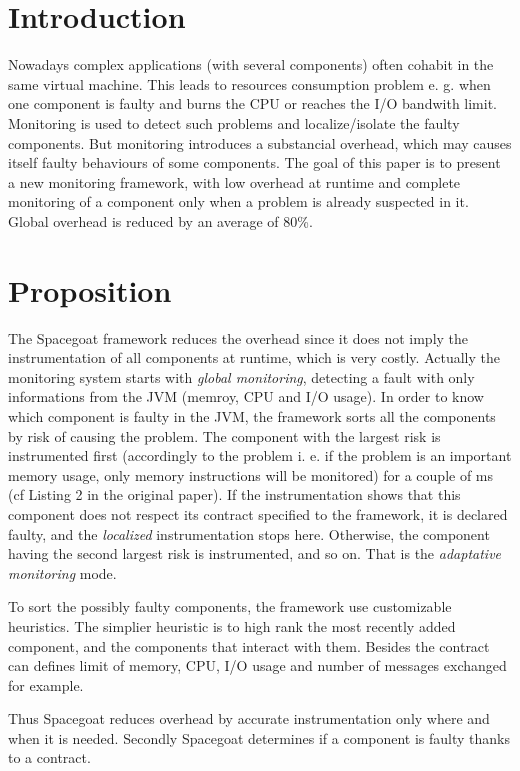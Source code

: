 \section{Introduction}

Nowadays complex applications (with several components) often cohabit in the same virtual machine. This leads to resources consumption problem e. g. when one component is faulty and burns the CPU or reaches the I/O bandwith limit. Monitoring is used to detect such problems and localize/isolate the faulty components. But monitoring introduces a substancial overhead, which may causes itself faulty behaviours of some components. The goal of this paper is to present a new monitoring framework, with low overhead at runtime and complete monitoring of a component only when a problem is already suspected in it. Global overhead is reduced by an average of 80\%.

\section{Proposition}

The \textsf{Spacegoat} framework reduces the overhead since it does not imply the instrumentation of all components at runtime, which is very costly. Actually the monitoring system starts with \emph{global monitoring}, detecting a fault with only informations from the JVM (memroy, CPU and I/O usage). In order to know which component is faulty in the JVM, the framework sorts all the components by risk of causing the problem. The component with the largest risk is instrumented first (accordingly to the problem i. e. if the problem is an important memory usage, only memory instructions will be monitored) for a couple of ms (cf Listing 2 in the original paper). If the instrumentation shows that this component does not respect its contract specified to the framework, it is declared faulty, and the \emph{localized} instrumentation stops here. Otherwise, the component having the second largest risk is instrumented, and so on. That is the \emph{adaptative monitoring} mode.

To sort the possibly faulty components, the framework use customizable heuristics. The simplier heuristic is to high rank the most recently added component, and the components that interact with them. Besides the contract can defines limit of memory, CPU, I/O usage and number of messages exchanged for example.

Thus \textsf{Spacegoat} reduces overhead by accurate instrumentation only where and when it is needed. Secondly \textsf{Spacegoat} determines if a component is faulty thanks to a contract. 

